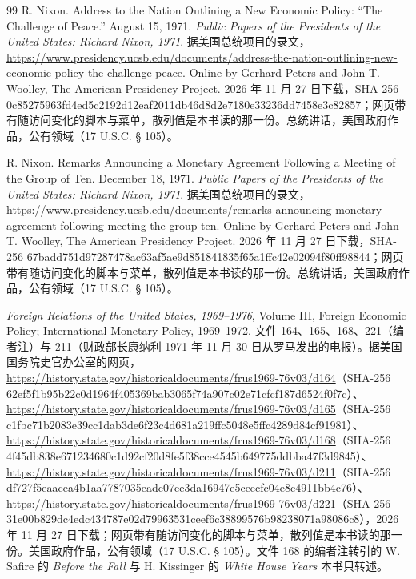 \begin{thebibliography}{99}
 R. Nixon. Address to the Nation Outlining a New Economic Policy: “The Challenge of Peace.” August 15, 1971. \emph{Public Papers of the Presidents of the United States: Richard Nixon, 1971}. 据美国总统项目的录文，\url{https://www.presidency.ucsb.edu/documents/address-the-nation-outlining-new-economic-policy-the-challenge-peace}. Online by Gerhard Peters and John T. Woolley, The American Presidency Project. 2026 年 11 月 27 日下载，SHA-256 0c85275963fd4ed5c2192d12eaf2011db46d8d2e7180e33236dd7458e3c82857；网页带有随访问变化的脚本与菜单，散列值是本书读的那一份。总统讲话，美国政府作品，公有领域（17 U.S.C. § 105）。

 R. Nixon. Remarks Announcing a Monetary Agreement Following a Meeting of the Group of Ten. December 18, 1971. \emph{Public Papers of the Presidents of the United States: Richard Nixon, 1971}. 据美国总统项目的录文，\url{https://www.presidency.ucsb.edu/documents/remarks-announcing-monetary-agreement-following-meeting-the-group-ten}. Online by Gerhard Peters and John T. Woolley, The American Presidency Project. 2026 年 11 月 27 日下载，SHA-256 67badd751d97287478ac63af5ae9d851841835f65a1ffc42e02094f80ff98844；网页带有随访问变化的脚本与菜单，散列值是本书读的那一份。总统讲话，美国政府作品，公有领域（17 U.S.C. § 105）。

 \emph{Foreign Relations of the United States, 1969--1976}, Volume III, Foreign Economic Policy; International Monetary Policy, 1969--1972. 文件 164、165、168、221（编者注）与 211（财政部长康纳利 1971 年 11 月 30 日从罗马发出的电报）。据美国国务院史官办公室的网页，\url{https://history.state.gov/historicaldocuments/frus1969-76v03/d164}（SHA-256 62ef5f1b95b22c0d1964f405369bab3065f74a907c02e71cfcf187d6524f0f7c）、\url{https://history.state.gov/historicaldocuments/frus1969-76v03/d165}（SHA-256 c1fbc71b2083e39cc1dab3de6f23c4d681a219ffc5048e5ffc4289d84cf91981）、\url{https://history.state.gov/historicaldocuments/frus1969-76v03/d168}（SHA-256 4f45db838e671234680c1d92cf20d8fe5f38cce4545b649775ddbba47f3d9845）、\url{https://history.state.gov/historicaldocuments/frus1969-76v03/d211}（SHA-256 df727f5eaacea4b1aa7787035eadc07ee3da16947e5ceecfc04e8c4911bb4c76）、\url{https://history.state.gov/historicaldocuments/frus1969-76v03/d221}（SHA-256 31e00b829dc4edc434787e02d79963531ceef6c38899576b98238071a98086c8），2026 年 11 月 27 日下载；网页带有随访问变化的脚本与菜单，散列值是本书读的那一份。美国政府作品，公有领域（17 U.S.C. § 105）。文件 168 的编者注转引的 W. Safire 的 \emph{Before the Fall} 与 H. Kissinger 的 \emph{White House Years} 本书只转述。


\end{thebibliography}
